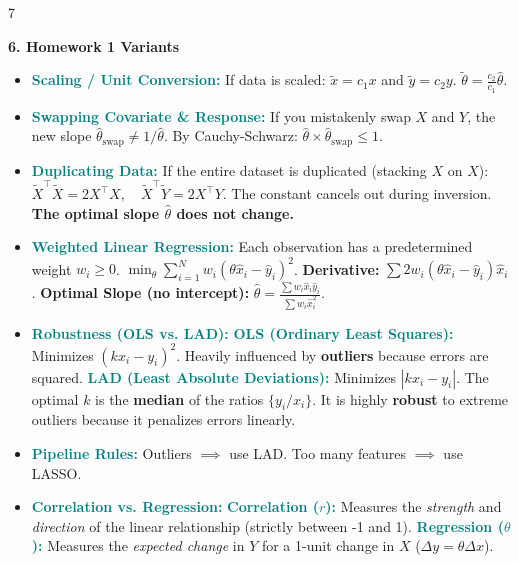 \documentclass{article}
\newcommand{\hlhighlight}[1]{\par\vspace{1.5pt}\noindent\colorbox{yellow!50}{\parbox{\dimexpr\columnwidth-2\fboxsep\relax}{\textbf{#1}}}\par\vspace{0.5pt}}
\newcommand{\sectitle}[1]{\par\textbf{\color{blue!70!black}{#1}}\par}
\newcommand{\concept}[1]{\textcolor{teal}{\textbf{#1}}}
\newcommand{\lbl}[1]{\textcolor{green!60!black}{\textbf{#1}}}
\begin{document}
\begin{multicols}{7}
\hlhighlight{6. Homework 1 Variants}
\sectitle{Transformations \& Comparisons}
\begin{itemize}
    \item \concept{Scaling / Unit Conversion:} If data is scaled: $\tilde{x} = c_1 x$ and $\tilde{y} = c_2 y$. $\tilde{\theta} = \frac{c_2}{c_1} \hat{\theta}$.
    \item \concept{Swapping Covariate \& Response:} If you mistakenly swap $X$ and $Y$, the new slope $\hat{\theta}_{\text{swap}} \neq 1 / \hat{\theta}$. By Cauchy-Schwarz: $\hat{\theta} \times \hat{\theta}_{\text{swap}} \leq 1$.
    \item \concept{Duplicating Data:} If the entire dataset is duplicated (stacking $X$ on $X$): $\tilde{X}^\top \tilde{X} = 2 X^\top X, \quad \tilde{X}^\top \tilde{Y} = 2 X^\top Y$. The constant cancels out during inversion. \lbl{The optimal slope $\hat{\theta}$ does not change.}
    \item \concept{Weighted Linear Regression:} Each observation has a predetermined weight $w_i \geq 0$. $\min_{\theta} \sum_{i=1}^N w_i(\theta\hat{x}_i - \hat{y}_i)^2$. \lbl{Derivative:} $\sum 2w_i(\theta\hat{x}_i - \hat{y}_i)\hat{x}_i$. \lbl{Optimal Slope (no intercept):} $\hat{\theta} = \frac{\sum w_i \hat{x}_i \hat{y}_i}{\sum w_i \hat{x}_i^2}$.
    \item \concept{Robustness (OLS vs. LAD):} \concept{OLS (Ordinary Least Squares):} Minimizes $(kx_i - y_i)^2$. Heavily influenced by \lbl{outliers} because errors are squared. \concept{LAD (Least Absolute Deviations):} Minimizes $|kx_i - y_i|$. The optimal $k$ is the \lbl{median} of the ratios $\{y_i / x_i\}$. It is highly \lbl{robust} to extreme outliers because it penalizes errors linearly.
    \item \concept{Pipeline Rules:} Outliers $\implies$ use LAD. Too many features $\implies$ use LASSO.
    \item \concept{Correlation vs. Regression:} \concept{Correlation ($r$):} Measures the \textit{strength} and \textit{direction} of the linear relationship (strictly between -1 and 1). \concept{Regression ($\theta$):} Measures the \textit{expected change} in $Y$ for a 1-unit change in $X$ ($\Delta y = \theta \Delta x$).
\end{itemize}


\end{multicols}
\end{document}
